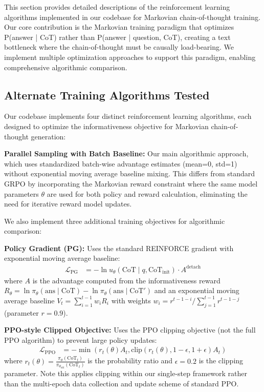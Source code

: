 \documentclass{article} %
\begin{document}
This section provides detailed descriptions of the reinforcement learning algorithms implemented in our codebase for Markovian chain-of-thought training. Our core contribution is the Markovian training paradigm that optimizes P(answer | CoT) rather than P(answer | question, CoT), creating a text bottleneck where the chain-of-thought must be causally load-bearing. We implement multiple optimization approaches to support this paradigm, enabling comprehensive algorithmic comparison.

\subsection{Alternate Training Algorithms Tested}

Our codebase implements four distinct reinforcement learning algorithms, each designed to optimize the informativeness objective for Markovian chain-of-thought generation:

\textbf{Parallel Sampling with Batch Baseline:} Our main algorithmic approach, which uses standardized batch-wise advantage estimates (mean=0, std=1) without exponential moving average baseline mixing. This differs from standard GRPO by incorporating the Markovian reward constraint where the same model parameters $\theta$ are used for both policy and reward calculation, eliminating the need for iterative reward model updates.

We also implement three additional training objectives for algorithmic comparison:

\textbf{Policy Gradient (PG):} Uses the standard REINFORCE gradient with exponential moving average baseline:
\begin{align}
\mathcal{L}_{\text{PG}} &= -\ln u_\theta(\text{CoT} \mid q, \text{CoT}_{\text{init}}) \cdot A^{\text{detach}}
\end{align}
where $A$ is the advantage computed from the informativeness reward $R_\theta = \ln \pi_\theta(\text{ans} \mid \text{CoT}) - \ln \pi_\theta(\text{ans} \mid \text{CoT}')$ and an exponential moving average baseline $V_t = \sum_{i=1}^{t-1} w_i R_i$ with weights $w_i = r^{t-1-i} / \sum_{j=1}^{t-1} r^{t-1-j}$ (parameter $r = 0.9$).

\textbf{PPO-style Clipped Objective:} Uses the PPO clipping objective (not the full PPO algorithm) to prevent large policy updates:
\begin{align}
\mathcal{L}_{\text{PPO}} &= -\min(r_t(\theta) A_t, \text{clip}(r_t(\theta), 1-\epsilon, 1+\epsilon) A_t)
\end{align}
where $r_t(\theta) = \frac{\pi_\theta(\text{CoT}_t)}{\pi_{\theta_{\text{old}}}(\text{CoT}_t)}$ is the probability ratio and $\epsilon = 0.2$ is the clipping parameter. Note this applies clipping within our single-step framework rather than the multi-epoch data collection and update scheme of standard PPO.
\end{document}
